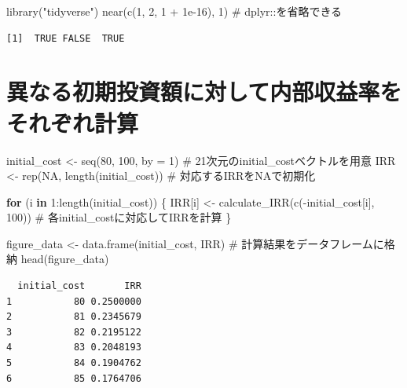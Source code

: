 \documentclass[
  letterpaper,
  DIV=11,
  numbers=noendperiod]{scrreprt}
\newenvironment{Shaded}{\begin{snugshade}}{\end{snugshade}}
\newcommand{\AttributeTok}[1]{\textcolor[rgb]{0.40,0.45,0.13}{#1}}
\newcommand{\CommentTok}[1]{\textcolor[rgb]{0.37,0.37,0.37}{#1}}
\newcommand{\ConstantTok}[1]{\textcolor[rgb]{0.56,0.35,0.01}{#1}}
\newcommand{\ControlFlowTok}[1]{\textcolor[rgb]{0.00,0.23,0.31}{\textbf{#1}}}
\newcommand{\DecValTok}[1]{\textcolor[rgb]{0.68,0.00,0.00}{#1}}
\newcommand{\FloatTok}[1]{\textcolor[rgb]{0.68,0.00,0.00}{#1}}
\newcommand{\FunctionTok}[1]{\textcolor[rgb]{0.28,0.35,0.67}{#1}}
\newcommand{\NormalTok}[1]{\textcolor[rgb]{0.00,0.23,0.31}{#1}}
\newcommand{\OtherTok}[1]{\textcolor[rgb]{0.00,0.23,0.31}{#1}}
\newcommand{\SpecialCharTok}[1]{\textcolor[rgb]{0.37,0.37,0.37}{#1}}
\newcommand{\StringTok}[1]{\textcolor[rgb]{0.13,0.47,0.30}{#1}}
\begin{document}
\begin{Shaded}
\begin{Highlighting}[]
\FunctionTok{library}\NormalTok{(}\StringTok{"tidyverse"}\NormalTok{)}
\FunctionTok{near}\NormalTok{(}\FunctionTok{c}\NormalTok{(}\DecValTok{1}\NormalTok{, }\DecValTok{2}\NormalTok{, }\DecValTok{1} \SpecialCharTok{+} \FloatTok{1e{-}16}\NormalTok{), }\DecValTok{1}\NormalTok{) }\CommentTok{\# dplyr::を省略できる}
\end{Highlighting}
\end{Shaded}

\begin{verbatim}
[1]  TRUE FALSE  TRUE
\end{verbatim}

\section{異なる初期投資額に対して内部収益率をそれぞれ計算}\label{ux7570ux306aux308bux521dux671fux6295ux8cc7ux984dux306bux5bfeux3057ux3066ux5185ux90e8ux53ceux76caux7387ux3092ux305dux308cux305eux308cux8a08ux7b97}

\begin{Shaded}
\begin{Highlighting}[]
\NormalTok{initial\_cost }\OtherTok{\textless{}{-}} \FunctionTok{seq}\NormalTok{(}\DecValTok{80}\NormalTok{, }\DecValTok{100}\NormalTok{, }\AttributeTok{by =} \DecValTok{1}\NormalTok{) }\CommentTok{\# 21次元のinitial\_costベクトルを用意}
\NormalTok{IRR }\OtherTok{\textless{}{-}} \FunctionTok{rep}\NormalTok{(}\ConstantTok{NA}\NormalTok{, }\FunctionTok{length}\NormalTok{(initial\_cost)) }\CommentTok{\# 対応するIRRをNAで初期化}

\ControlFlowTok{for}\NormalTok{ (i }\ControlFlowTok{in} \DecValTok{1}\SpecialCharTok{:}\FunctionTok{length}\NormalTok{(initial\_cost)) \{}
\NormalTok{  IRR[i] }\OtherTok{\textless{}{-}} \FunctionTok{calculate\_IRR}\NormalTok{(}\FunctionTok{c}\NormalTok{(}\SpecialCharTok{{-}}\NormalTok{initial\_cost[i], }\DecValTok{100}\NormalTok{)) }\CommentTok{\# 各initial\_costに対応してIRRを計算}
\NormalTok{\}}

\NormalTok{figure\_data }\OtherTok{\textless{}{-}} \FunctionTok{data.frame}\NormalTok{(initial\_cost, IRR) }\CommentTok{\# 計算結果をデータフレームに格納}
\FunctionTok{head}\NormalTok{(figure\_data)}
\end{Highlighting}
\end{Shaded}

\begin{verbatim}
  initial_cost       IRR
1           80 0.2500000
2           81 0.2345679
3           82 0.2195122
4           83 0.2048193
5           84 0.1904762
6           85 0.1764706
\end{verbatim}
\end{document}
